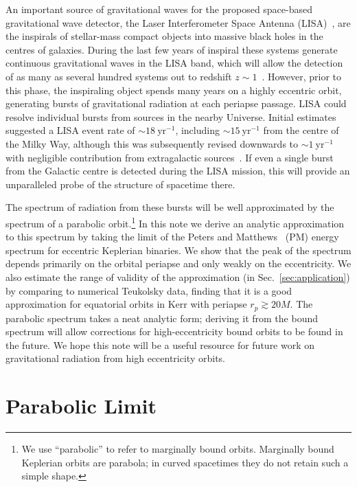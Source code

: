 \documentclass[aps,prd,amsfonts,amssymb,amsmath,nofootinbib,floatfix,reprint,showpacs,groupedaddress]{revtex4-1}
\newcommand{\secref}[1]{Sec.~\ref{sec:#1}}
\newcommand{\units}[1]{\ensuremath{~\mathrm{#1}}}
\begin{document}
An important source of gravitational waves for the proposed space-based gravitational wave detector, the Laser Interferometer Space Antenna (LISA)~\cite{Bender1998, Danzmann2003}, are the inspirals of stellar-mass compact objects into massive black holes in the centres of galaxies. During the last few years of inspiral these systems generate continuous gravitational waves in the LISA band, which will allow the detection of as many as several hundred systems out to redshift $z \sim 1$~\cite{Gair2009}. However, prior to this phase, the inspiraling object spends many years on a highly eccentric orbit, generating bursts of gravitational radiation at each periapse passage. LISA could resolve individual bursts from sources in the nearby Universe. Initial estimates~\cite{Rubbo2006} suggested a LISA event rate of $\sim18\units{yr^{-1}}$, including $\sim15\units{yr^{-1}}$ from the centre of the Milky Way, although this was subsequently revised downwards to $\sim1\units{yr^{-1}}$ with negligible contribution from extragalactic sources~\cite{Hopman2007}. If even a single burst from the Galactic centre is detected during the LISA mission, this will provide an unparalleled probe of the structure of spacetime there.

The spectrum of radiation from these bursts will be well approximated by the spectrum of a parabolic orbit.\footnote{We use ``parabolic'' to refer to marginally bound orbits. Marginally bound Keplerian orbits are parabola; in curved spacetimes they do not retain such a simple shape.} In this note we derive an analytic approximation to this spectrum by taking the limit of the Peters and Matthews~\cite{Peters1963, Peters1964} (PM) energy spectrum for eccentric Keplerian binaries. We show that the peak of the spectrum depends primarily on the orbital periapse and only weakly on the eccentricity. We also estimate the range of validity of the approximation (in \secref{application}) by comparing to numerical Teukolsky data, finding that it is a good approximation for equatorial orbits in Kerr with periapse $r_{p} \gtrsim 20M$. The parabolic spectrum takes a neat analytic form; deriving it from the bound spectrum will allow corrections for high-eccentricity bound orbits to be found in the future. We hope this note will be a useful resource for future work on gravitational radiation from high eccentricity orbits.

\section{Parabolic Limit\label{sec:limit}}
\end{document}
